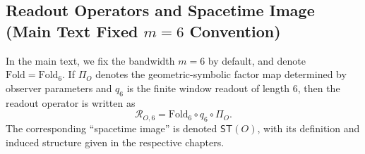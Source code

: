 \subsection*{Readout Operators and Spacetime Image (Main Text Fixed $m=6$ Convention)}
In the main text, we fix the bandwidth $m=6$ by default, and denote $\mathrm{Fold}=\mathrm{Fold}_6$. If $\Pi_O$ denotes the geometric-symbolic factor map determined by observer parameters and $q_6$ is the finite window readout of length $6$, then the readout operator is written as
$$
\mathcal{R}_{O,6}=\mathrm{Fold}_6\circ q_6\circ \Pi_O.
$$
The corresponding ``spacetime image'' is denoted $\mathsf{ST}(O)$, with its definition and induced structure given in the respective chapters.
